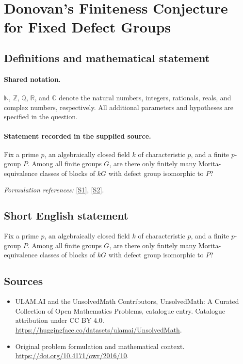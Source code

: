 \documentclass[11pt]{article}
\newcommand{\sref}[2]{\hyperlink{source:#1:#2}{[S#2]}}
\begin{document}
\section{Donovan’s Finiteness Conjecture for Fixed Defect Groups}\label{statement}

\subsection{Definitions and mathematical statement}

\paragraph{Shared notation.}$\mathbb N$, $\mathbb Z$, $\mathbb Q$, $\mathbb R$, and $\mathbb C$ denote the natural numbers, integers, rationals, reals, and complex numbers, respectively. All additional parameters and hypotheses are specified in the question.


\paragraph{Statement recorded in the supplied source.}
Fix a prime $p$, an algebraically closed field $k$ of characteristic $p$, and a finite $p$-group $P$. Among all finite groups $G$, are there only finitely many Morita-equivalence classes of blocks of $kG$ with defect group isomorphic to $P$?
\par\smallskip\textit{Formulation references:} \sref{statement}{1}, \sref{statement}{2}.
\subsection{Short English statement}
Fix a prime $p$, an algebraically closed field $k$ of characteristic $p$, and a finite $p$-group $P$. Among all finite groups $G$, are there only finitely many Morita-equivalence classes of blocks of $kG$ with defect group isomorphic to $P$?
\subsection{Sources}
\begin{itemize}
\item[\hypertarget{source:statement:1}{S1}] ULAM.AI and the UnsolvedMath Contributors, UnsolvedMath: A Curated Collection of Open Mathematics Problems, catalogue entry. Catalogue attribution under CC BY 4.0.
\url{https://huggingface.co/datasets/ulamai/UnsolvedMath}.
\item[\hypertarget{source:statement:2}{S2}] Original problem formulation and mathematical context.
\url{https://doi.org/10.4171/owr/2016/10}.
\end{itemize}
\label{end:statement}
\end{document}
